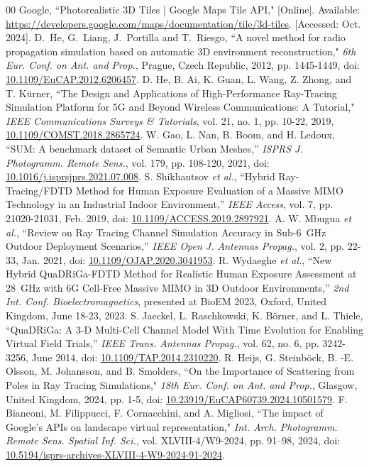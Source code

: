 \documentclass{IEEEtran}
\newcommand*{\doi}[1]{\href{http://dx.doi.org/#1}{#1}}
\begin{document}
\begin{thebibliography}{00}
 Google, ``Photorealistic 3D Tiles | Google Maps Tile API," [Online]. Available: \url{https://developers.google.com/maps/documentation/tile/3d-tiles}. [Accessed: Oct. 2024].
 D.~He, G.~Liang, J.~Portilla and T.~Riesgo, ``A novel method for radio propagation simulation based on automatic 3D environment reconstruction," \textit{6th Eur. Conf. on Ant. and Prop.}, Prague, Czech Republic, 2012, pp. 1445-1449, doi: \doi{10.1109/EuCAP.2012.6206457}.
 D. He, B. Ai, K. Guan, L. Wang, Z. Zhong, and T. Kürner, ``The Design and Applications of High-Performance Ray-Tracing Simulation Platform for 5G and Beyond Wireless Communications: A Tutorial," \textit{IEEE Communications Surveys \& Tutorials}, vol. 21, no. 1, pp. 10-22, 2019, \doi{10.1109/COMST.2018.2865724}.
 W. Gao, L. Nan, B. Boom, and H. Ledoux, ``SUM: A benchmark dataset of Semantic Urban Meshes,'' \textit{ISPRS J. Photogramm. Remote Sens.}, vol. 179, pp. 108-120, 2021, doi: \doi{10.1016/j.isprsjprs.2021.07.008}.
 S. Shikhantsov \textit{et al.}, ``Hybrid Ray-Tracing/FDTD Method for Human Exposure Evaluation of a Massive MIMO Technology in an Industrial Indoor Environment,'' \textit{IEEE Access}, vol. 7, pp. 21020-21031, Feb. 2019, doi: \doi{10.1109/ACCESS.2019.2897921}.
 A. W. Mbugua \textit{et al.}, ``Review on Ray Tracing Channel Simulation Accuracy in Sub-6~GHz Outdoor Deployment Scenarios,'' \textit{IEEE Open J. Antennas Propag.}, vol. 2, pp. 22-33, Jan. 2021, doi: \doi{10.1109/OJAP.2020.3041953}.
 R. Wydaeghe \textit{et al.}, ``New Hybrid QuaDRiGa-FDTD Method for Realistic Human Exposure Assessment at 28~GHz with 6G Cell-Free Massive MIMO in 3D Outdoor Environments,'' \textit{2nd Int. Conf. Bioelectromagnetics}, presented at BioEM 2023, Oxford, United Kingdom, June 18-23, 2023.
 S. Jaeckel, L. Raschkowski, K. Börner, and L. Thiele, ``QuaDRiGa: A 3-D Multi-Cell Channel Model With Time Evolution for Enabling Virtual Field Trials,'' \textit{IEEE Trans. Antennas Propag.}, vol. 62, no. 6, pp. 3242-3256, June 2014, doi: \doi{10.1109/TAP.2014.2310220}.
 R. Heijs, G. Steinböck, B. -E. Olsson, M. Johansson, and B. Smolders, ``On the Importance of Scattering from Poles in Ray Tracing Simulations," \textit{18th Eur. Conf. on Ant. and Prop.}, Glasgow, United Kingdom, 2024, pp. 1-5, doi: \doi{10.23919/EuCAP60739.2024.10501579}.
 F. Bianconi, M. Filippucci, F. Cornacchini, and A. Migliosi, ``The impact of Google’s APIs on landscape virtual representation," \textit{Int. Arch. Photogramm. Remote Sens. Spatial Inf. Sci.}, vol. XLVIII-4/W9-2024, pp. 91–98, 2024, doi: \doi{10.5194/isprs-archives-XLVIII-4-W9-2024-91-2024}.

\end{thebibliography}
\end{document}
